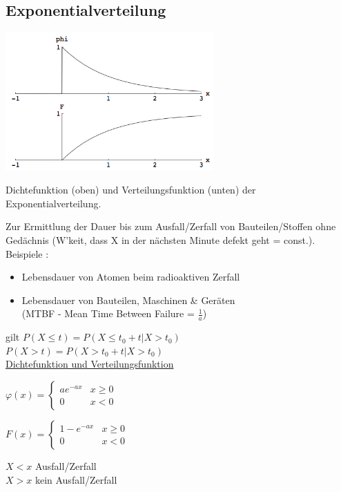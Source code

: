 	\subsection{Exponentialverteilung \skript{\pageref{sk-section-exponentialverteilung}}}
		\begin{floatingfigure}[r]{8cm}
        \includegraphics[width=8cm]{./bilder/exponentialverteilung.png}
        \caption{Dichtefunktion (oben) und Verteilungsfunktion (unten) der
        Exponentialverteilung.} 		
		\end{floatingfigure}

		Zur Ermittlung der Dauer bis zum Ausfall/Zerfall von Bauteilen/Stoffen ohne Gedächnis
		(W'keit, dass X in der nächsten Minute defekt geht = const.). Beispiele :
		\begin{itemize}
          \item Lebensdauer von Atomen beim radioaktiven Zerfall
          \item Lebensdauer von Bauteilen, Maschinen \& Geräten\\(MTBF -
          Mean Time Between Failure = $\frac{1}{a}$)
    \end{itemize}
    
    gilt $P(X \leq t) = P(X \leq t_0 + t | X > t_0)$\\
    $P(X > t) = P(X > t_0 + t | X > t_0)$\\
    
		\underline{Dichtefunktion und Verteilungsfunktion}\\
    \begin{minipage}{5cm}
      $\varphi(x)=\begin{cases}
        a e^{-a x}  & x \geq 0\\
        0						& x < 0
      \end{cases}$
      
      $F(x)=\begin{cases}
        1-e^{-a x}  		& x \geq 0\\
        0	 					& x < 0
      \end{cases}$
    \end{minipage} 
    \begin{minipage}{4.5cm}
      $X < x$ Ausfall/Zerfall\\
      $X > x$ kein Ausfall/Zerfall
    \end{minipage}\\
    
